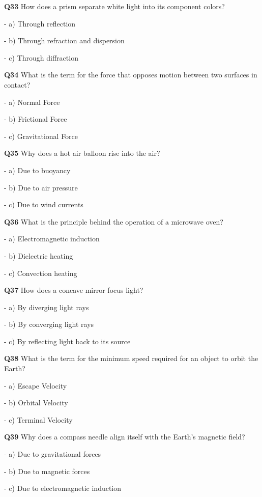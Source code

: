 \textbf{Q33} How does a prism separate white light into its component colors?\par
\quad - a) Through reflection\par
\quad - b) Through refraction and dispersion\par
\quad - c) Through diffraction\par

\textbf{Q34} What is the term for the force that opposes motion between two surfaces in contact?\par
\quad - a) Normal Force\par
\quad - b) Frictional Force\par
\quad - c) Gravitational Force\par

\textbf{Q35} Why does a hot air balloon rise into the air?\par
\quad - a) Due to buoyancy\par
\quad - b) Due to air pressure\par
\quad - c) Due to wind currents\par

\textbf{Q36} What is the principle behind the operation of a microwave oven?\par
\quad - a) Electromagnetic induction\par
\quad - b) Dielectric heating\par
\quad - c) Convection heating\par

\textbf{Q37} How does a concave mirror focus light?\par
\quad - a) By diverging light rays\par
\quad - b) By converging light rays\par
\quad - c) By reflecting light back to its source\par

\textbf{Q38} What is the term for the minimum speed required for an object to orbit the Earth?\par
\quad - a) Escape Velocity\par
\quad - b) Orbital Velocity\par
\quad - c) Terminal Velocity\par

\textbf{Q39} Why does a compass needle align itself with the Earth's magnetic field?\par
\quad - a) Due to gravitational forces\par
\quad - b) Due to magnetic forces\par
\quad - c) Due to electromagnetic induction\par

